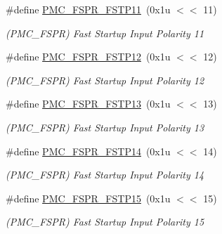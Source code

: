 \begin{DoxyCompactItemize}
\mbox{\label{group__SAMV71__PMC_gaf2c300cdc4856c2dd7d1e1969886cb9b}} 
\#define \mbox{\hyperlink{group__SAMV71__PMC_gaf2c300cdc4856c2dd7d1e1969886cb9b}{P\+M\+C\+\_\+\+F\+S\+P\+R\+\_\+\+F\+S\+T\+P11}}~(0x1u $<$$<$ 11)
\begin{DoxyCompactList}\small\item\em (P\+M\+C\+\_\+\+F\+S\+PR) Fast Startup Input Polarity 11 \end{DoxyCompactList}\item 
\mbox{\label{group__SAMV71__PMC_ga687949a08c29554e21890356c019e2d8}} 
\#define \mbox{\hyperlink{group__SAMV71__PMC_ga687949a08c29554e21890356c019e2d8}{P\+M\+C\+\_\+\+F\+S\+P\+R\+\_\+\+F\+S\+T\+P12}}~(0x1u $<$$<$ 12)
\begin{DoxyCompactList}\small\item\em (P\+M\+C\+\_\+\+F\+S\+PR) Fast Startup Input Polarity 12 \end{DoxyCompactList}\item 
\mbox{\label{group__SAMV71__PMC_gab0cb8b39ace8a891b00b8bc8d961acdd}} 
\#define \mbox{\hyperlink{group__SAMV71__PMC_gab0cb8b39ace8a891b00b8bc8d961acdd}{P\+M\+C\+\_\+\+F\+S\+P\+R\+\_\+\+F\+S\+T\+P13}}~(0x1u $<$$<$ 13)
\begin{DoxyCompactList}\small\item\em (P\+M\+C\+\_\+\+F\+S\+PR) Fast Startup Input Polarity 13 \end{DoxyCompactList}\item 
\mbox{\label{group__SAMV71__PMC_ga4d6fe77d7d37e36ab3e289aaa9b9ab31}} 
\#define \mbox{\hyperlink{group__SAMV71__PMC_ga4d6fe77d7d37e36ab3e289aaa9b9ab31}{P\+M\+C\+\_\+\+F\+S\+P\+R\+\_\+\+F\+S\+T\+P14}}~(0x1u $<$$<$ 14)
\begin{DoxyCompactList}\small\item\em (P\+M\+C\+\_\+\+F\+S\+PR) Fast Startup Input Polarity 14 \end{DoxyCompactList}\item 
\mbox{\label{group__SAMV71__PMC_gaeb71bc909c4ed234066c0acbe8aa2452}} 
\#define \mbox{\hyperlink{group__SAMV71__PMC_gaeb71bc909c4ed234066c0acbe8aa2452}{P\+M\+C\+\_\+\+F\+S\+P\+R\+\_\+\+F\+S\+T\+P15}}~(0x1u $<$$<$ 15)
\begin{DoxyCompactList}\small\item\em (P\+M\+C\+\_\+\+F\+S\+PR) Fast Startup Input Polarity 15 \end{DoxyCompactList}\item 
$$
\end{DoxyCompactItemize}
